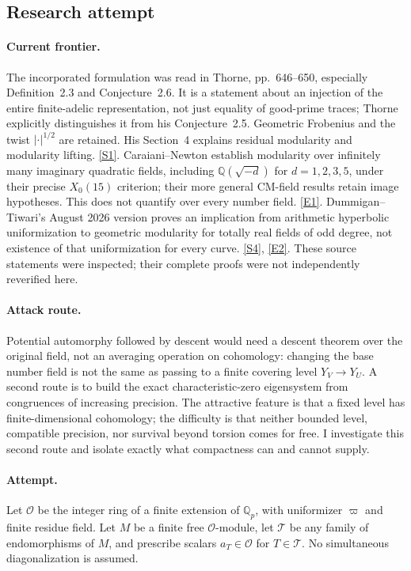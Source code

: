 \documentclass[11pt,a4paper]{article}
\newcommand{\Q}{\mathbb{Q}}
\newcommand{\sref}[2]{\hyperlink{source:#1:#2}{[S#2]}}
\newcommand{\eref}[2]{\hyperlink{extra:#1:#2}{[E#2]}}
\numberwithin{equation}{section}
\begin{document}
\subsection{Research attempt}

\paragraph{Current frontier.}
The incorporated formulation was read in Thorne, pp.~646--650, especially
Definition~2.3 and Conjecture~2.6. It is a statement about an injection of the
entire finite-adelic representation, not just equality of good-prime traces;
Thorne explicitly distinguishes it from his Conjecture~2.5. Geometric
Frobenius and the twist $|\cdot|^{1/2}$ are retained. His Section~4 explains
residual modularity and modularity lifting. \sref{30006690}{1}.
Caraiani--Newton establish modularity over infinitely many imaginary quadratic
fields, including $\Q(\sqrt{-d})$ for $d=1,2,3,5$, under their precise
$X_0(15)$ criterion; their more general CM-field results retain image
hypotheses. This does not quantify over every number field. \eref{30006690}{1}.
Dummigan--Tiwari's August 2026 version proves an implication from arithmetic
hyperbolic uniformization to geometric modularity for totally real fields of
odd degree, not existence of that uniformization for every curve.
\sref{30006690}{4}, \eref{30006690}{2}. These source statements were inspected; their
complete proofs were not independently reverified here.

\paragraph{Attack route.}
Potential automorphy followed by descent would need a descent theorem over the
original field, not an averaging operation on cohomology: changing the base
number field is not the same as passing to a finite covering level $Y_V\to Y_U$.
A second route is to build the exact characteristic-zero eigensystem from
congruences of increasing precision. The attractive feature is that a fixed
level has finite-dimensional cohomology; the difficulty is that neither
bounded level, compatible precision, nor survival beyond torsion comes for
free. I investigate this second route and isolate exactly what compactness
can and cannot supply.

\paragraph{Attempt.}
Let $\mathcal O$ be the integer ring of a finite extension of $\Q_p$, with
uniformizer $\varpi$ and finite residue field. Let $M$ be a finite free
$\mathcal O$-module, let $\mathcal T$ be any family of endomorphisms of $M$,
and prescribe scalars $a_T\in\mathcal O$ for $T\in\mathcal T$. No simultaneous
diagonalization is assumed.
\end{document}
